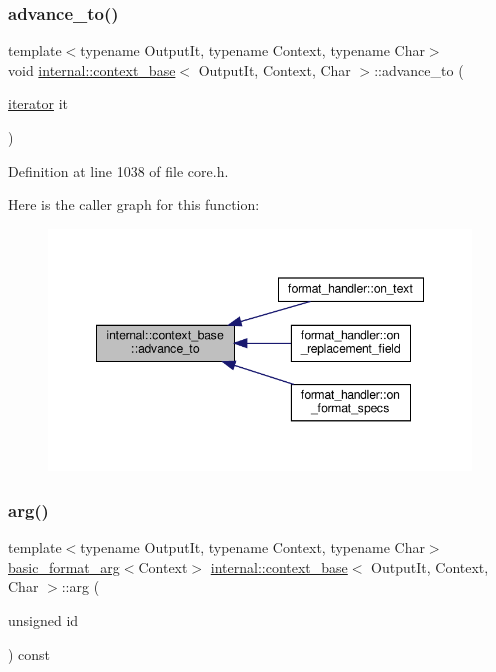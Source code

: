 \subsubsection{\texorpdfstring{advance\+\_\+to()}{advance\_to()}}
{\footnotesize\ttfamily template$<$typename Output\+It, typename Context, typename Char$>$ \\
void \hyperlink{classinternal_1_1context__base}{internal\+::context\+\_\+base}$<$ Output\+It, Context, Char $>$\+::advance\+\_\+to (\begin{DoxyParamCaption}\item[{\hyperlink{classinternal_1_1context__base_a6486e3c9656c10eb99a4731fb169e51b}{iterator}}]{it }\end{DoxyParamCaption})\hspace{0.3cm}{\ttfamily [inline]}}



Definition at line 1038 of file core.\+h.

Here is the caller graph for this function\+:
\nopagebreak
\begin{figure}[H]
\begin{center}
\leavevmode
\includegraphics[width=348pt]{classinternal_1_1context__base_a9b9ce1c9b8d586251ab40312840779c9_icgraph}
\end{center}
\end{figure}
\mbox{\label{classinternal_1_1context__base_a87e06ec53f13930b9e1fb1e3e6762632}} 
\subsubsection{\texorpdfstring{arg()}{arg()}}
{\footnotesize\ttfamily template$<$typename Output\+It, typename Context, typename Char$>$ \\
\hyperlink{classbasic__format__arg}{basic\+\_\+format\+\_\+arg}$<$Context$>$ \hyperlink{classinternal_1_1context__base}{internal\+::context\+\_\+base}$<$ Output\+It, Context, Char $>$\+::arg (\begin{DoxyParamCaption}\item[{unsigned}]{id }\end{DoxyParamCaption}) const\hspace{0.3cm}{\ttfamily [inline]}}



